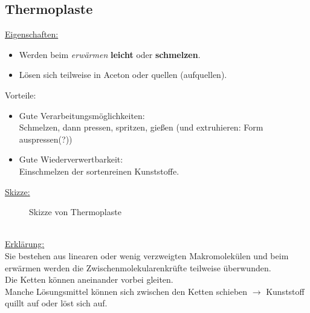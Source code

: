 \documentclass[../../main.tex]{subfiles}
\begin{document}
\subsection{Thermoplaste}
\underline{Eigenschaften:}
\begin{itemize}
    \item Werden beim \textit{erwärmen} \textbf{leicht} oder \textbf{schmelzen}.
    \item Lösen sich teilweise in Aceton oder quellen (aufquellen).
\end{itemize}
Vorteile:
\begin{itemize}
    \item Gute Verarbeitungsmöglichkeiten:\\
        Schmelzen, dann pressen, spritzen, gießen (und extruhieren: Form auspressen(?))
    \item Gute Wiederverwertbarkeit: \\
        Einschmelzen der sortenreinen Kunststoffe.
\end{itemize}
\underline{Skizze:}
\begin{figure}[ht]
    \centering
    \caption{Skizze von Thermoplaste}
    \label{fig:skizze_thermoplaste}
\end{figure}
\\
\underline{Erklärung:} \\
Sie bestehen aus linearen oder wenig verzweigten Makromolekülen und beim
erwärmen werden die Zwischenmolekularenkrüfte teilweise überwunden. \\
Die Ketten können aneinander vorbei gleiten. \\
Manche Lösungsmittel können sich zwischen den Ketten schieben $\rightarrow$
Kunststoff quillt auf oder löst sich auf.
%
%
\end{document}

